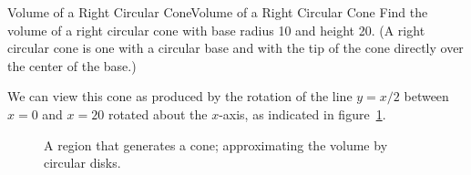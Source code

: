 \begin{example}{Volume of a Right Circular Cone}{Volume of a Right Circular Cone}\label{Volume of a Right Circular Cone}
Find the volume of a right circular cone with base radius 10 and
height 20. (A right circular cone is one with a circular base and with
the tip of the cone directly over the center of the base.)
\end{example}

\begin{solution}
We can view this cone as produced by the rotation of the line $y=x/2$ between $ x=0 $ and $ x= 20 $ rotated about the $x$-axis, as indicated in
figure~\ref{fig:line to cone}.







\begin{figure}[H]
\caption{\label{fig:line to cone}
A region that generates a cone; approximating the volume
by circular disks.}
\end{figure}




\end{solution}
